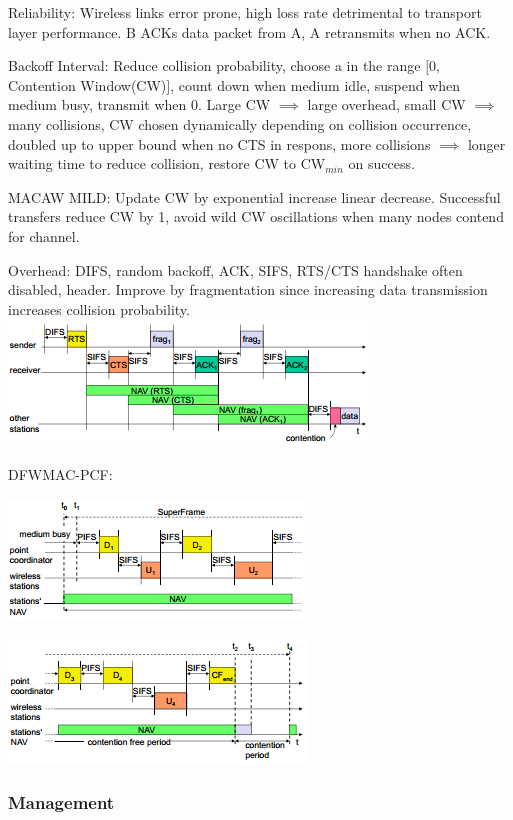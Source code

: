 \documentclass[8pt]{extarticle}
\begin{document}
\begin{multicols}{2}
Reliability: Wireless links error prone, high loss rate detrimental to transport layer performance. B ACKs data packet from A, A retransmits when no ACK.

Backoff Interval: Reduce collision probability, choose a in the range $[0$, Contention Window(CW)$]$, count down when medium idle, suspend when medium busy, transmit when 0. Large CW $\implies$ large overhead, small CW $\implies$  many collisions, CW chosen dynamically depending on collision occurrence, doubled up to upper bound when no CTS in respons, more collisions $\implies$ longer waiting time to reduce collision, restore CW to CW$_{min}$ on success.

MACAW MILD: Update CW by exponential increase linear decrease. Successful transfers reduce CW by 1, avoid wild CW oscillations when many nodes contend for channel. 

Overhead: DIFS, random backoff, ACK, SIFS, RTS/CTS handshake often disabled, header. Improve by fragmentation since increasing data transmission increases collision probability. \includegraphics{fragmentation.png}

DFWMAC-PCF: 

\includegraphics{dfwmac-pcf1.png}

\includegraphics{dfwmac-pcf2.png}

\subsubsection{Management}


\end{multicols}
\end{document}
